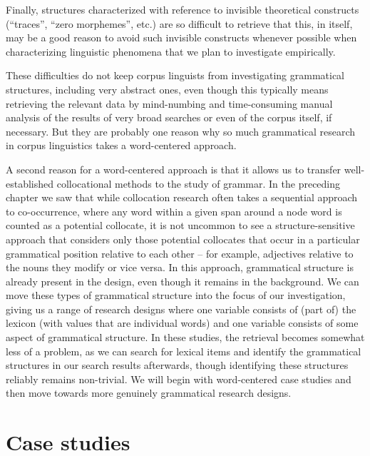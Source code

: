 Finally, structures characterized with reference to invisible theoretical constructs (``traces'', ``zero morphemes'',  etc.) are so difficult to retrieve  that this, in itself, may be a good reason to avoid such invisible constructs whenever possible when characterizing linguistic phenomena that we plan to investigate empirically.

These difficulties do not keep corpus linguists from investigating grammatical  structures, including very abstract ones, even though this typically means retrieving the relevant data by mind\hyp{}numbing and time\hyp{}consuming manual  analysis of the results of very broad searches or even of the corpus itself, if necessary. But they are probably one reason why so much grammatical  research in corpus linguistics takes a word\hyp{}centered approach.

A second reason for a word\hyp{}centered approach is that it allows us to transfer well\hyp{}established collocational  methods to the study of grammar.  In the preceding chapter we saw that while collocation research often takes a sequential approach to co\hyp{}occurrence, where any word within a given span  around a node word is counted as a potential collocate, it is not uncommon to see a structure\hyp{}sensitive approach that considers only those potential collocates  that occur in a particular grammatical position relative to each other -- for example, adjectives  relative to the nouns  they modify or vice versa. In this approach, grammatical structure is already present in the design,  even though it remains in the background. We can move these types of grammatical structure into the focus of our investigation, giving us a range of research designs where one variable consists of (part of) the lexicon  (with values that are individual words) and one variable consists of some aspect of grammatical  structure. In these studies, the retrieval  becomes somewhat less of a problem, as we can search for lexical items and identify the grammatical structures in our search results afterwards, though identifying these structures reliably  remains non\hyp{}trivial. We will begin with word\hyp{}centered case studies and then move towards more genuinely grammatical research  designs.

\section{Case studies}
\label{sec:grammarcasestudies}

